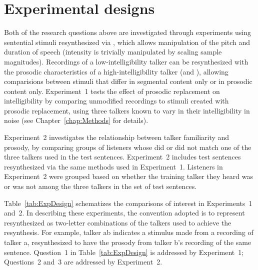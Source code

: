 \section{Experimental designs}
Both of the research questions above are investigated through experiments using sentential stimuli resynthesized via \psola{} \citep{MoulinesCharpentier1990}, which allows manipulation of the pitch and duration of speech (intensity is trivially manipulated by scaling sample magnitudes).  Recordings of a low-intelligibility talker can be resynthesized with the prosodic characteristics of a high-intelligibility talker (and \vv), allowing comparisions between stimuli that differ in segmental content only or in prosodic content only.  Experiment~1 tests the effect of prosodic replacement on intelligibility by comparing unmodified recordings to stimuli created with prosodic replacement, using three talkers known to vary in their intelligibility in noise (see Chapter~\ref{chap:Methods} for details).

Experiment~2 investigates the relationship between talker familiarity and prosody, by comparing groups of listeners whose  did or did not match one of the three talkers used in the test sentences.  Experiment~2 includes test sentences resynthesized via the same methods used in Experiment~1.  Listeners in Experiment~2 were grouped based on whether the training talker they heard was or was not among the three talkers in the set of test sentences.

Table~\ref{tab:ExpDesign} schematizes the comparisons of interest in Experiments~1 and~2.  In describing these experiments, the convention adopted is to represent resynthesized  as two-letter combinations of the talkers used to achieve the resynthesis.  For example, talker \ac{ab} indicates a stimulus made from a recording of talker \ac{a}, resynthesized to have the prosody from talker \ac{b}’s recording of the same sentence.  Question~1 in Table~\ref{tab:ExpDesign} is addressed by Experiment~1; Questions~2 and~3 are addressed by Experiment~2.

